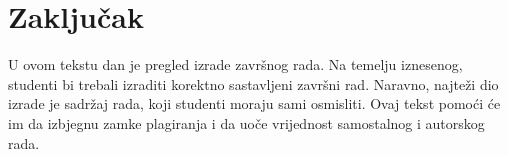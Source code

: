 \section{Zaključak}
U ovom tekstu dan je pregled izrade završnog rada. Na temelju iznesenog, studenti bi trebali izraditi korektno sastavljeni završni rad. 
Naravno, najteži dio izrade je 
sadržaj rada, koji studenti moraju sami osmisliti. 
Ovaj tekst pomoći će im da izbjegnu zamke plagiranja i da uoče vrijednost samostalnog i autorskog rada.
